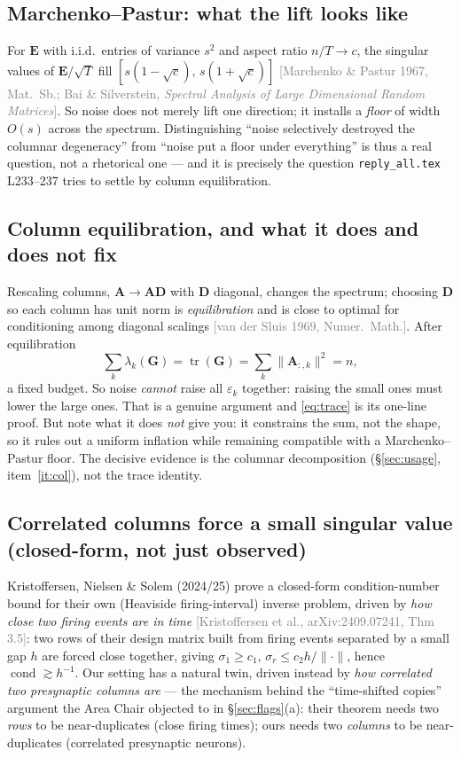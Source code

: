 \documentclass[11pt]{article}
\newcommand{\Mat}[1]{\mathbf{#1}}
\newcommand{\A}{\Mat{A}}
\DeclareMathOperator{\cond}{cond}
\DeclareMathOperator{\tr}{tr}
\newcommand{\eps}{\varepsilon}
\newcommand{\src}[1]{{\footnotesize\textcolor{gray}{[#1]}}}
\begin{document}
\subsection{Marchenko--Pastur: what the lift looks like}
For $\Mat E$ with i.i.d.\ entries of variance $s^2$ and aspect ratio
$n/T \to c$, the singular values of $\Mat E/\sqrt T$ fill
$[s(1-\sqrt c),\, s(1+\sqrt c)]$ \src{Marchenko \& Pastur 1967, Mat.\ Sb.; Bai
\& Silverstein, \emph{Spectral Analysis of Large Dimensional Random Matrices}}.
So noise does not merely lift one direction; it installs a \emph{floor} of width
$O(s)$ across the spectrum. Distinguishing ``noise selectively destroyed the
columnar degeneracy'' from ``noise put a floor under everything'' is thus a real
question, not a rhetorical one --- and it is precisely the question
\texttt{reply\_all.tex} L233--237 tries to settle by column equilibration.

\subsection{Column equilibration, and what it does and does not fix}
Rescaling columns, $\A \to \A\Mat D$ with $\Mat D$ diagonal, changes the
spectrum; choosing $\Mat D$ so each column has unit norm is
\emph{equilibration} and is close to optimal for conditioning among diagonal
scalings \src{van der Sluis 1969, Numer.\ Math.}. After equilibration
\begin{equation}
\sum_k \lambda_k(\Mat G) = \tr(\Mat G) = \sum_{k} \|\A_{:,k}\|^2 = n ,
\label{eq:trace}
\end{equation}
a fixed budget. So noise \emph{cannot} raise all $\eps_k$ together: raising the
small ones must lower the large ones. That is a genuine argument and
\eqref{eq:trace} is its one-line proof. But note what it does \emph{not} give
you: it constrains the sum, not the shape, so it rules out a uniform inflation
while remaining compatible with a Marchenko--Pastur floor. The decisive evidence
is the columnar decomposition (§\ref{sec:usage}, item~\ref{it:col}), not the
trace identity.

\subsection{Correlated columns force a small singular value (closed-form, not
just observed)}
\label{sec:corr-cols}

Kristoffersen, Nielsen \& Solem (2024/25) prove a closed-form
condition-number bound for their own (Heaviside firing-interval) inverse
problem, driven by \emph{how close two firing events are in time}
\src{Kristoffersen et al., arXiv:2409.07241, Thm 3.5}: two rows of their
design matrix built from firing events separated by a small gap $h$ are
forced close together, giving $\sigma_1\ge c_1$, $\sigma_r\le c_2h/\|\cdot\|$,
hence $\cond\gtrsim h^{-1}$. Our setting has a natural twin, driven instead
by \emph{how correlated two presynaptic columns are} --- the mechanism
behind the ``time-shifted copies'' argument the Area Chair objected to in
\S\ref{sec:flags}(a): their theorem needs two \emph{rows} to be
near-duplicates (close firing times); ours needs two \emph{columns} to be
near-duplicates (correlated presynaptic neurons).
\end{document}
